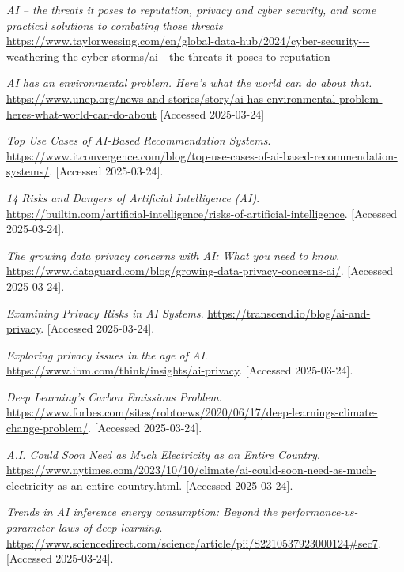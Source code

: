 \documentclass[licencjacka,en]{pracamgr}
\begin{document}
\begin{thebibliography}{99}
    \textit{AI – the threats it poses to reputation, privacy and cyber security, and some practical solutions to combating those threats}
    \url{https://www.taylorwessing.com/en/global-data-hub/2024/cyber-security---weathering-the-cyber-storms/ai---the-threats-it-poses-to-reputation}
    
    \textit{AI has an environmental problem. Here’s what the world can do about that.}
    \url{https://www.unep.org/news-and-stories/story/ai-has-environmental-problem-heres-what-world-can-do-about}
    [Accessed 2025-03-24]
    
    \textit{Top Use Cases of AI-Based Recommendation Systems}.
    \url{https://www.itconvergence.com/blog/top-use-cases-of-ai-based-recommendation-systems/}.
    [Accessed 2025-03-24].
    
    \textit{ 14 Risks and Dangers of Artificial Intelligence (AI)}.
    \url{https://builtin.com/artificial-intelligence/risks-of-artificial-intelligence}.
    [Accessed 2025-03-24].
    
    \textit{The growing data privacy concerns with AI: What you need to know}.
    \url{https://www.dataguard.com/blog/growing-data-privacy-concerns-ai/}.
    [Accessed 2025-03-24].
    
    \textit{Examining Privacy Risks in AI Systems}.
    \url{https://transcend.io/blog/ai-and-privacy}.
    [Accessed 2025-03-24].
    
    \textit{Exploring privacy issues in the age of AI}.
    \url{https://www.ibm.com/think/insights/ai-privacy}.
    [Accessed 2025-03-24].
    
    
    \textit{Deep Learning’s Carbon Emissions Problem}.
    \url{https://www.forbes.com/sites/robtoews/2020/06/17/deep-learnings-climate-change-problem/}.
    [Accessed 2025-03-24].
    
    \textit{A.I. Could Soon Need as Much Electricity as an Entire Country}.
    \url{https://www.nytimes.com/2023/10/10/climate/ai-could-soon-need-as-much-electricity-as-an-entire-country.html}.
    [Accessed 2025-03-24].
    
    \textit{Trends in AI inference energy consumption: Beyond the performance-vs-parameter laws of deep learning}.
    \url{https://www.sciencedirect.com/science/article/pii/S2210537923000124#sec7}.
    [Accessed 2025-03-24].
    

\end{thebibliography}
\end{document}
